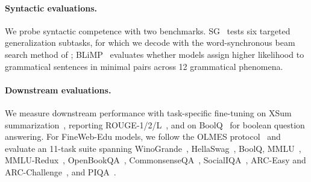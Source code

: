 \documentclass[11pt]{article}
\begin{document}
\paragraph{Syntactic evaluations.} We probe syntactic competence with two benchmarks. SG~\cite{hu-etal-2020-systematic} tests six targeted generalization subtasks, for which we decode with the word-synchronous beam search method of \citet{stern-etal-2017-effective}; BLiMP~\cite{warstadt-etal-2020-blimp-benchmark} evaluates whether models assign higher likelihood to grammatical sentences in minimal pairs across 12 grammatical phenomena.

\paragraph{Downstream evaluations.} We measure downstream performance with task-specific fine-tuning on XSum summarization~\cite{narayan-etal-2018-dont}, reporting ROUGE-1/2/L~\cite{lin-2004-rouge}, and on BoolQ~\cite{clark-etal-2019-boolq} for boolean question answering. For FineWeb-Edu models, we follow the OLMES protocol~\cite{gu-etal-2025-olmes} and evaluate an 11-task suite spanning WinoGrande~\cite{sakaguchi2020winogrande}, HellaSwag~\cite{zellers-etal-2019-hellaswag}, BoolQ, MMLU~\cite{hendrycks2021measuring}, MMLU-Redux~\cite{gema-etal-2025-done}, OpenBookQA~\cite{mihaylov-etal-2018-suit}, CommonsenseQA~\cite{talmor-etal-2019-commonsenseqa}, SocialIQA~\cite{sap-etal-2019-social}, ARC-Easy and ARC-Challenge~\cite{clark2018think}, and PIQA~\cite{bisk2020piqa}.
\end{document}
